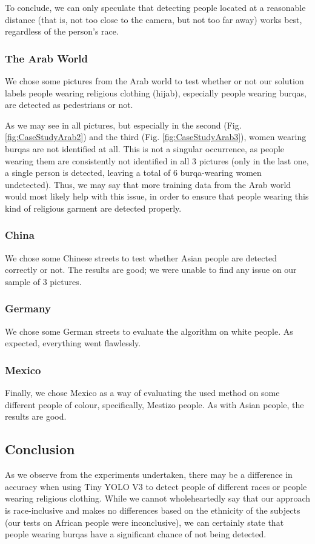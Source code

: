 \documentclass[runningheads,a4paper,11pt]{report}
\begin{document}
To conclude, we can only speculate that detecting people located at a reasonable distance (that is, not too close to the camera, but not too far away) works best, regardless of the person's race.

\subsubsection{The Arab World}
We chose some pictures from the Arab world to test whether or not our solution labels people wearing religious clothing (hijab), especially people wearing burqas, are detected as pedestrians or not.


As we may see in all pictures, but especially in the second (Fig. \ref{fig:CaseStudyArab2}) and the third (Fig. \ref{fig:CaseStudyArab3}), women wearing burqas are not identified at all. This is not a singular occurrence, as people wearing them are consistently not identified in all 3 pictures (only in the last one, a single person is detected, leaving a total of 6 burqa-wearing women undetected). Thus, we may say that more training data from the Arab world would most likely help with this issue, in order to ensure that people wearing this kind of religious garment are detected properly.

\subsubsection{China}
We chose some Chinese streets to test whether Asian people are detected correctly or not. The results are good; we were unable to find any issue on our sample of 3 pictures.

\subsubsection{Germany}
We chose some German streets to evaluate the algorithm on white people. As expected, everything went flawlessly.

\subsubsection{Mexico}
Finally, we chose Mexico as a way of evaluating the used method on some different people of colour, specifically, Mestizo people. As with Asian people, the results are good.

\subsection{Conclusion} As we observe from the experiments undertaken, there may be a difference in accuracy when using Tiny YOLO V3 to detect people of different races or people wearing religious clothing. While we cannot wholeheartedly say that our approach is race-inclusive and makes no differences based on the ethnicity of the subjects (our tests on African people were inconclusive), we can certainly state that people wearing burqas have a significant chance of not being detected.
\end{document}
